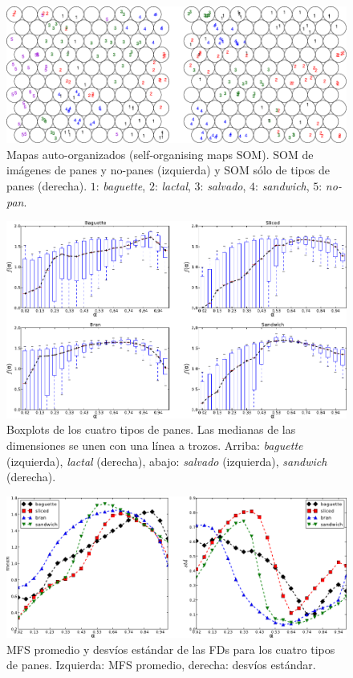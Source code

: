 \begin{figure}[h!]
\begin{centering}
\includegraphics[width=13cm]{SOM}
\caption{Mapas auto-organizados (self-organising maps SOM). SOM de imágenes de panes y no-panes (izquierda) y SOM sólo de tipos de panes (derecha). $1$: {\em baguette}, $2$: {\em lactal}, $3$: {\em salvado}, $4$: {\em sandwich}, $5$: {\em no-pan}.}
\label{fig:somfractal}
\end{centering}
\end{figure}

\begin{figure}[h!]
\centering
\includegraphics[width=13cm]{boxplots}
\caption{Boxplots de los cuatro tipos de panes. Las medianas de las dimensiones se unen con una línea a trozos. Arriba: {\em baguette} (izquierda), {\em lactal} (derecha), abajo: {\em salvado} (izquierda), {\em sandwich} (derecha).}
\label{fig:boxplotsMFS}
\end{figure}

\begin{figure}[h!]
\centering
\includegraphics[width=13cm]{panstd}
\caption{MFS promedio y desvíos estándar de las FDs para los cuatro tipos de panes. Izquierda: MFS promedio, derecha: desvíos estándar.}
\label{fig:meansMFS}
\end{figure}


